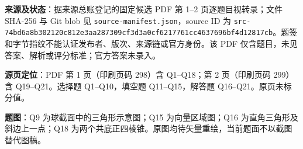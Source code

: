 

\begin{gktip}
\textbf{来源及状态}：据来源总账登记的固定候选 PDF 第 1–2 页逐题目视转录；文件 SHA-256 与 Git blob 见 \texttt{source-manifest.json}，source ID 为 \texttt{src-74bd6a8b302120c812e3aa287309cf3d3a0cf6217761cc4637696bf4d12817cb}。题签和字节指纹不能认证发布者、版次、来源链或官方身份。该 PDF 仅含题目，未见答案、解析或评分标准；官方答案未录入。

\textbf{源页定位}：PDF 第 1 页（印刷页码 298）含 Q1–Q18；第 2 页（印刷页码 299）含 Q19–Q21。选择题 Q1–Q10，填空题 Q11–Q15，解答题 Q16–Q21。原页未标分值。

\textbf{题图}：Q9 为球截面中的三角形示意图；Q15 为向量区域图；Q16 为直角三角形及斜边上一点；Q18 为两个共底正四棱锥。原图均待矢量重绘，当前题面不以截图替代图稿。
\end{gktip}


